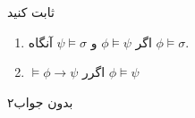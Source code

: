 ثابت کنید
\begin{enumerate}[label=(\alph*)]
\item
اگر
$\phi\models\psi$
و
$\psi\models\sigma$
آنگاه
$\phi\models\sigma$.

\item
$\models\phi\to\psi$
اگرر
$\phi\models\psi$
\end{enumerate}\quad
\begin{ans}
 ۲بدون جواب
\end{ans}
